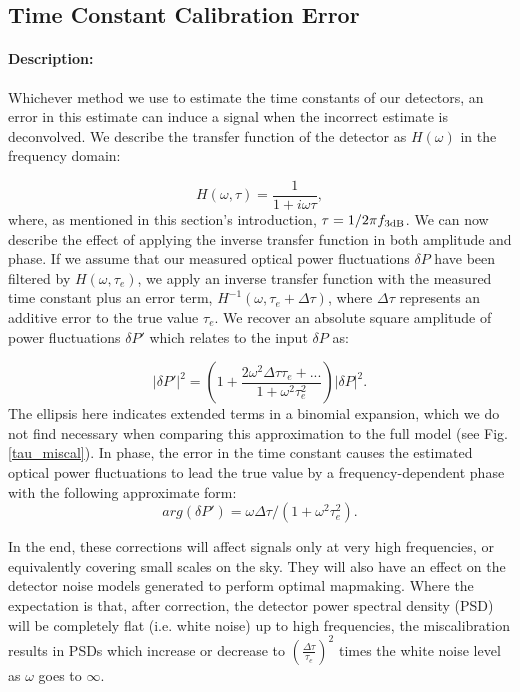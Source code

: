 \subsection{Time Constant Calibration Error}

\paragraph{Description:}
Whichever method we use to estimate the time constants of our detectors, an error in this estimate can induce a signal when the incorrect estimate is deconvolved. We describe the transfer function of the detector as $H(\omega)$ in the frequency domain:

\begin{equation}
\label{tc_transfer}
H(\omega, \tau) = \frac{1}{1 + i \omega \tau},
\end{equation}
where, as mentioned in this section's introduction, $\tau = 1/2 \pi f_{\mbox{\scriptsize 3dB}}$. We can now describe the effect of applying the inverse transfer function in both amplitude and phase. If we assume that our measured optical power fluctuations $\delta P$ have been filtered by $H(\omega, \tau_e)$, we apply an inverse transfer function with the measured time constant plus an error term, $H^{-1} (\omega, \tau_e + \Delta \tau)$, where $\Delta \tau$ represents an additive error to the true value $\tau_e$. We recover an absolute square amplitude of power fluctuations $\delta P'$ which relates to the input $\delta P$ as:

\begin{equation}
\label{amp_correct_approx}
|\delta P'|^2 = (1 + \frac{2 \omega^2 \Delta \tau \tau_e + ...}{1 + \omega^2 \tau_e^2}) |\delta P|^2.
\end{equation}
The ellipsis here indicates extended terms in a binomial expansion, which we do not find necessary when comparing this approximation to the full model (see Fig. \ref{tau_miscal}). In phase, the error in the time constant causes the estimated optical power fluctuations to lead the true value by a frequency-dependent phase with the following approximate form:
\begin{equation}
\label{phase_correct_approx}
arg(\delta P') = \omega \Delta \tau / (1 + \omega^2 \tau_e^2).
\end{equation}

In the end, these corrections will affect signals only at very high frequencies, or equivalently covering small scales on the sky. They will also have an effect on the detector noise models generated to perform optimal mapmaking. Where the expectation is that, after correction, the detector power spectral density (PSD) will be completely flat (i.e. white noise) up to high frequencies, the miscalibration results in PSDs which increase or decrease to $(\frac{\Delta \tau}{\tau_e})^2$ times the white noise level as $\omega$ goes to $\infty$.

